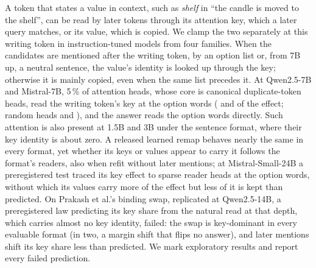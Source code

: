 A token that states a value in context, such as \emph{shelf} in ``the candle is moved to the shelf'', can be read by later tokens through its attention key, which a later query matches, or its value, which is copied. We clamp the two separately at this writing token in \nModels{} instruction-tuned models from four families. When the candidates are mentioned after the writing token, by an option list or, from 7B up, a neutral sentence, the value's identity is looked up through the key; otherwise it is mainly copied, even when the same list precedes it. At Qwen2.5-7B and Mistral-7B, 5\,\% of attention heads, whose core is canonical duplicate-token heads, read the writing token's key at the option words (\HoneRQwenSeven{} and \HoneRMistralSeven{} of the effect; random heads \HtwoRrandQwenSeven{} and \HtwoRrandMistralSeven{}), and the answer reads the option words directly. Such attention is also present at 1.5B and 3B under the sentence format, where their key identity is about zero. A released learned remap behaves nearly the same in every format, yet whether its keys or values appear to carry it follows the format's readers, also when refit without later mentions; at Mistral-Small-24B a preregistered test traced its key effect to sparse reader heads at the option words, without which its values carry more of the effect but less of it is kept than predicted. On Prakash et al.'s binding swap, replicated at Qwen2.5-14B, a preregistered law predicting its key share from the natural read at that depth, which carries almost no key identity, failed: the swap is key-dominant in every evaluable format (in two, a margin shift that flips no answer), and later mentions shift its key share less than predicted. We mark exploratory results and report every failed prediction.
